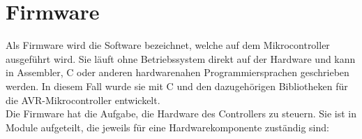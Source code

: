 


\chapter{Firmware}
Als Firmware wird die Software bezeichnet, welche auf dem Mikrocontroller ausgeführt wird. Sie läuft ohne Betriebssystem direkt auf der Hardware und kann in Assembler, C oder anderen hardwarenahen Programmiersprachen geschrieben werden. In diesem Fall wurde sie mit C und den dazugehörigen Bibliotheken für die AVR-Mikrocontroller entwickelt.\\
Die Firmware hat die Aufgabe, die Hardware des Controllers zu steuern. Sie ist in Module aufgeteilt, die jeweils für eine Hardwarekomponente zuständig sind:

